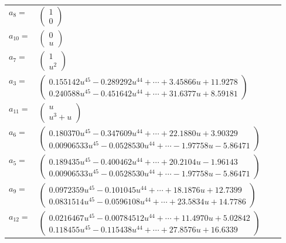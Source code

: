 \documentclass[1p]{elsarticle_modified}
\theoremstyle{definition}
\begin{document}
\begin{tabular}{m{7pt} m{180pt} m{7pt} m{180pt} }
\flushright $a_{8}=$&$\begin{pmatrix}1\\0\end{pmatrix}$ \\
\flushright $a_{10}=$&$\begin{pmatrix}0\\u\end{pmatrix}$ \\
\flushright $a_{7}=$&$\begin{pmatrix}1\\u^2\end{pmatrix}$ \\
\flushright $a_{3}=$&$\begin{pmatrix}0.155142 u^{45}-0.289292 u^{44}+\cdots+3.45866 u+11.9278\\0.240588 u^{45}-0.451642 u^{44}+\cdots+31.6377 u+8.59181\end{pmatrix}$ \\
\flushright $a_{11}=$&$\begin{pmatrix}u\\u^3+u\end{pmatrix}$ \\
\flushright $a_{6}=$&$\begin{pmatrix}0.180370 u^{45}-0.347609 u^{44}+\cdots+22.1880 u+3.90329\\0.00906533 u^{45}-0.0528530 u^{44}+\cdots-1.97758 u-5.86471\end{pmatrix}$ \\
\flushright $a_{5}=$&$\begin{pmatrix}0.189435 u^{45}-0.400462 u^{44}+\cdots+20.2104 u-1.96143\\0.00906533 u^{45}-0.0528530 u^{44}+\cdots-1.97758 u-5.86471\end{pmatrix}$ \\
\flushright $a_{9}=$&$\begin{pmatrix}0.0972359 u^{45}-0.101045 u^{44}+\cdots+18.1876 u+12.7399\\0.0831514 u^{45}-0.0596108 u^{44}+\cdots+23.5834 u+14.7786\end{pmatrix}$ \\
\flushright $a_{12}=$&$\begin{pmatrix}0.0216467 u^{45}-0.00784512 u^{44}+\cdots+11.4970 u+5.02842\\0.118455 u^{45}-0.115438 u^{44}+\cdots+27.8576 u+16.6339\end{pmatrix}$ \\

\end{tabular}
\end{document}
